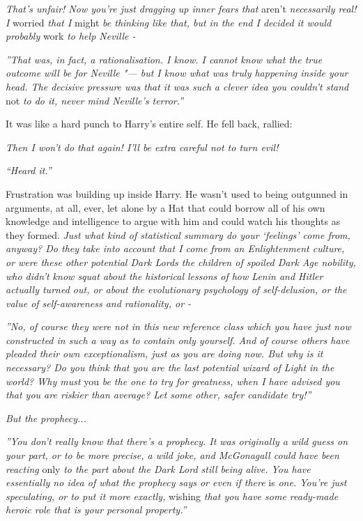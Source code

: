 \emph{That's unfair! Now you're just dragging up inner fears that}
aren't \emph{necessarily real! I} worried \emph{that I} might \emph{be
thinking like that, but in the end I decided it would probably} work
\emph{to help Neville -}

\emph{''That was, in fact, a rationalisation. I know. I cannot know what
the true outcome will be for Neville "--- but I know what was truly
happening inside your head. The decisive pressure was that it was such a
clever idea you couldn't stand} not \emph{to do it, never mind Neville's
terror.''}

It was like a hard punch to Harry's entire self. He fell back, rallied:

\emph{Then I won't do that again! I'll be extra careful not to turn
evil!}

\emph{``Heard it.''}

Frustration was building up inside Harry. He wasn't used to being
outgunned in arguments, at all, ever, let alone by a Hat that could
borrow all of his own knowledge and intelligence to argue with him and
could watch his thoughts as they formed. \emph{Just what kind of
statistical summary do your `feelings' come from, anyway? Do they take
into account that I come from an Enlightenment culture, or were these
other potential Dark Lords the children of spoiled Dark Age nobility,
who didn't know squat about the historical lessons of how Lenin and
Hitler actually turned out, or about the evolutionary psychology of
self-delusion, or the value of self-awareness and rationality, or -}

\emph{''No, of course they were not in this new reference class which you
have just now constructed in such a way as to contain only yourself. And
of course others have pleaded their own exceptionalism, just as you are
doing now. But why is it necessary? Do you think that you are the last
potential wizard of Light in the world? Why must} you \emph{be the one
to try for greatness, when I have advised you that you are riskier than
average? Let some other, safer candidate try!''}

\emph{But the prophecy...}

\emph{''You don't really know that there's a prophecy. It was originally
a wild guess on your part, or to be more precise, a wild joke, and
McGonagall could have been reacting} only \emph{to the part about the
Dark Lord still being alive. You have essentially no idea of what the
prophecy says or even if there} is \emph{one. You're just speculating,
or to put it more exactly,} wishing \emph{that you have some ready-made
heroic role that is your personal property.''}

